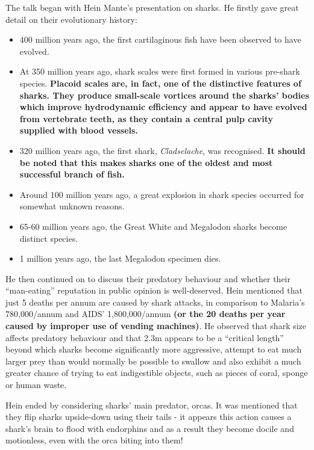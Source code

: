 	The talk began with Hein Mante's presentation on sharks. He firstly gave
	great detail on their evolutionary history:

	\begin{itemize}
		\item
		400 million years ago, the first cartilaginous fish have been observed
		to have evolved.
		\item
		At 350 million years ago, shark scales were first formed in various
		pre-shark species.
		\textbf{Placoid scales are, in fact, one of the distinctive features of sharks. They produce small-scale vortices around the sharks’ bodies which improve hydrodynamic efficiency and appear to have evolved from vertebrate teeth, as they contain a central pulp cavity supplied with blood vessels.}
		\item
		320 million years ago, the first shark, \textit{Cladselache}, was
		recognised.
		\textbf{It should be noted that this makes sharks one of the oldest and most successful branch of fish.}
		\item
		Around 100 million years ago, a great explosion in shark species
		occurred for somewhat unknown reasons.
		\item
		65-60 million years ago, the Great White and Megalodon sharks become
		distinct species.
		\item
		1 million years ago, the last Megalodon specimen dies.
	\end{itemize}

	He then continued on to discuss their predatory behaviour and whether
	their ``man-eating'' reputation in public opinion is well-deserved. Hein
	mentioned that just 5 deaths per annum are caused by shark attacks, in
	comparison to Malaria's 780,000/annum and AIDS' 1,800,000/annum
	\textbf{(or the 20 deaths per year caused by improper use of vending machines)}.
	He observed that shark size affects predatory behaviour and that 2.3m
	appears to be a ``critical length'' beyond which sharks become
	significantly more aggressive, attempt to eat much larger prey than
	would normally be possible to swallow and also exhibit a much greater
	chance of trying to eat indigestible objects, such as pieces of coral,
	sponge or human waste.

	Hein ended by considering sharks' main predator, orcas. It was mentioned
	that they flip sharks upside-down using their tails - it appears this
	action causes a shark's brain to flood with endorphins and as a result
	they become docile and motionless, even with the orca biting into them!

